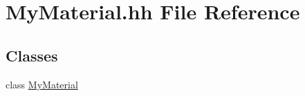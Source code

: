 \hypertarget{_my_material_8hh}{\section{My\-Material.\-hh File Reference}
\label{_my_material_8hh}
}
\subsection*{Classes}
\begin{DoxyCompactItemize}
\item 
class \hyperlink{class_my_material}{My\-Material}
\end{DoxyCompactItemize}
